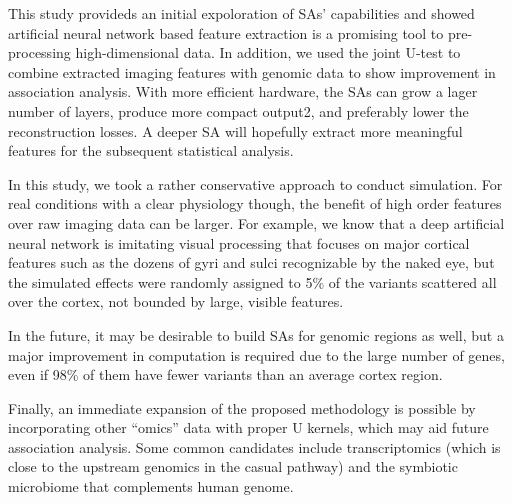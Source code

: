 \documentclass[11pt]{article}
\begin{document}
This study provideds an initial expoloration of SAs' capabilities and showed artificial neural network based feature extraction is a promising tool to pre-processing high-dimensional data. In addition, we used the joint U-test to combine extracted imaging features with genomic data to show improvement in association analysis. With more efficient hardware, the SAs can grow a lager number of layers, produce more compact output2, and preferably lower the reconstruction losses. A deeper SA will hopefully extract more meaningful features for the subsequent statistical analysis.

In this study, we took a rather conservative approach to conduct simulation. For real conditions with a clear physiology though, the benefit of high order features over raw imaging data can be larger. For example, we know that a deep artificial neural network is imitating visual processing that focuses on major cortical features such as the dozens of gyri and sulci recognizable by the naked eye, but the simulated effects were randomly assigned to 5\% of the variants scattered all over the cortex, not bounded by large, visible features.

In the future, it may be desirable to build SAs for genomic regions as well, but a major improvement in computation is required due to the large number of genes, even if 98\% of them have fewer variants than an average cortex region.

Finally, an immediate expansion of the proposed methodology is possible by incorporating other ``omics'' data with proper U kernels, which may aid future association analysis. Some common candidates include transcriptomics (which is close to the upstream genomics in the casual pathway) and the symbiotic microbiome that complements human genome.



% 

\clearpage
\end{document}

